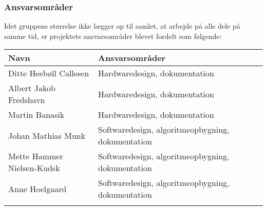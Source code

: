 \subsubsection{Ansvarsområder}

Idet gruppens størrelse ikke lægger op til samlet, at arbejde på alle dele på samme tid, er projektets ansvarsområder blevet fordelt som følgende:

\begin{longtabu} to 
    Navn &    Ansvarsområder &    \\[-1ex]
    \midrule
    Ditte Heebøll Callesen &   Hardwaredesign, dokumentation	&    \\
    Albert Jakob Fredshavn &   Hardwaredesign, dokumentation	&    \\
    Martin Banasik         &   Hardwaredesign, dokumentation	&    \\
    Johan Mathias Munk     &   Softwaredesign, algoritmeopbygning, dokumentation &    \\
    Mette Hammer Nielsen-Kudsk  &   Softwaredesign, algoritmeopbygning, dokumentation	&    \\
   	Anne Hoelgaard    &   Softwaredesign, algoritmeopbygning, dokumentation	&    \\
\label{version_Systemark}
\end{longtabu}
